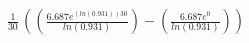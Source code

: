 \documentclass[preview]{standalone}
\begin{document}
\begin{align*}
\frac{1}{30}\,((\frac{6.687e^{(ln(0.931))30}}{ln(0.931)})-(\frac{6.687e^{0}}{ln(0.931)}))
\end{align*}
\end{document}
